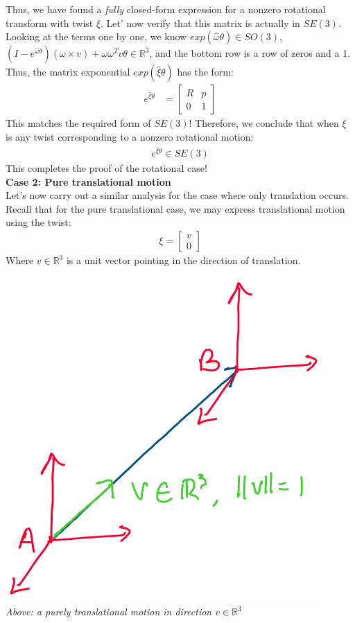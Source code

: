 \documentclass[oneside]{book}
\begin{document}
Thus, we have found a \textit{fully} closed-form expression for a nonzero rotational transform with twist $\xi$. Let' now verify that this matrix is actually in $SE(3)$.\\
Looking at the terms one by one, we know $exp(\hat\omega\theta) \in SO(3)$, $(I - e^{\hat\omega\theta})( \omega\times v) + \omega\omega^Tv\theta \in \mathbb{R}^3$, and the bottom row is a row of zeros and a 1. Thus, the matrix exponential $exp(\hat\xi\theta)$ has the form:
\begin{align}
    e^{\hat\xi\theta} &= 
    \begin{bmatrix}
        R & p\\
        0 & 1
    \end{bmatrix}
\end{align}
This matches the required form of $SE(3)$! Therefore, we conclude that when $\xi$ is any twist corresponding to a nonzero rotational motion:
\begin{align}
    e^{\hat\xi\theta} \in SE(3)
\end{align}
This completes the proof of the rotational case!\\
\textbf{Case 2: Pure translational motion}\\
Let's now carry out a similar analysis for the case where only translation occurs. Recall that for the pure translational case, we may express translational motion using the twist:
\begin{align}
    \xi = 
    \begin{bmatrix}
        v\\
        0
    \end{bmatrix}
\end{align}
Where $v \in \mathbb{R}^3$ is a unit vector pointing in the direction of translation.
\begin{center}
    \includegraphics[scale=0.3]{images/pure_translation.png}\\
    \textit{Above: a purely translational motion in direction $v \in \mathbb{R}^3$}
\end{center}
\end{document}

